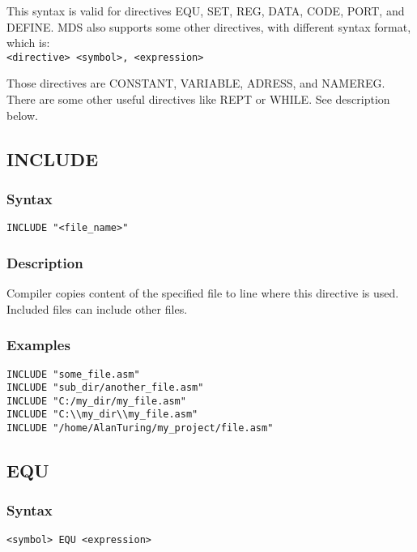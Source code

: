     \bigskip

    This syntax is valid for directives EQU, SET, REG, DATA, CODE, PORT, and DEFINE. MDS also supports some other directives, with different syntax format, which is:\\
    \verb'<directive> <symbol>, <expression>'

    \bigskip

    Those directives are CONSTANT, VARIABLE, ADRESS, and NAMEREG. There are some other useful directives like REPT or WHILE. See description below.

    \clearpage
    \subsection{INCLUDE}
        \subsubsection{Syntax}
            \verb'INCLUDE "<file_name>"'

        \subsubsection{Description}
            Compiler copies content of the specified file to line where this directive is used. Included files can include other files.

        \subsubsection{Examples}
            \verb'INCLUDE "some_file.asm"'\\
            \verb'INCLUDE "sub_dir/another_file.asm"'\\
            \verb'INCLUDE "C:/my_dir/my_file.asm"'\\
            \verb'INCLUDE "C:\\my_dir\\my_file.asm"'\\
            \verb'INCLUDE "/home/AlanTuring/my_project/file.asm"'

    \subsection{EQU}
        \subsubsection{Syntax}
            \verb'<symbol> EQU <expression>'

